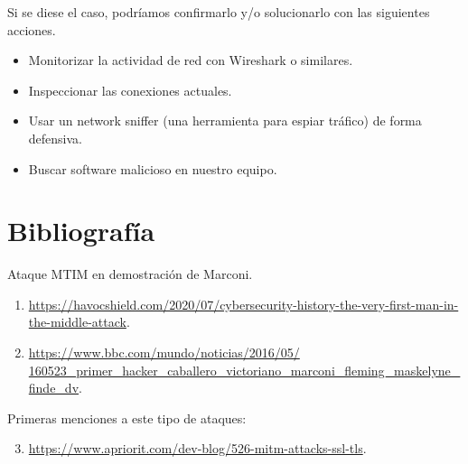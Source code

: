 \documentclass[11pt]{article}
\begin{document}
Si se diese el caso, podríamos confirmarlo y/o solucionarlo con las siguientes acciones.
\begin{itemize}
	\item Monitorizar la actividad de red con Wireshark o similares.
	\item Inspeccionar las conexiones actuales.
	\item Usar un network sniffer (una herramienta para espiar tráfico) de forma defensiva.
	\item Buscar software malicioso en nuestro equipo.
\end{itemize}

\section{Bibliografía}

Ataque MTIM en demostración de Marconi.
\begin{enumerate}
	\item \label{bib-item-1} \href{https://havocshield.com/2020/07/cybersecurity-history-the-very-first-man-in-the-middle-attack}{https://havocshield.com/2020/07/cybersecurity-history-the-very-first-man-in-the-middle-attack}.
	\item \label{bib-item-2} \href{https://www.bbc.com/mundo/noticias/2016/05/160523_primer_hacker_caballero_victoriano_marconi_fleming_maskelyne_finde_dv}{https://www.bbc.com/mundo/noticias/2016/05/\\160523\_primer\_hacker\_caballero\_victoriano\_marconi\_fleming\_maskelyne\_finde\_dv}.
\end{enumerate}

Primeras menciones a este tipo de ataques:
\begin{enumerate}
	\setcounter{enumi}{2}
	\item \label{bib-item-3} \href{https://www.apriorit.com/dev-blog/526-mitm-attacks-ssl-tls}{https://www.apriorit.com/dev-blog/526-mitm-attacks-ssl-tls}.
\end{enumerate}
\end{document}
